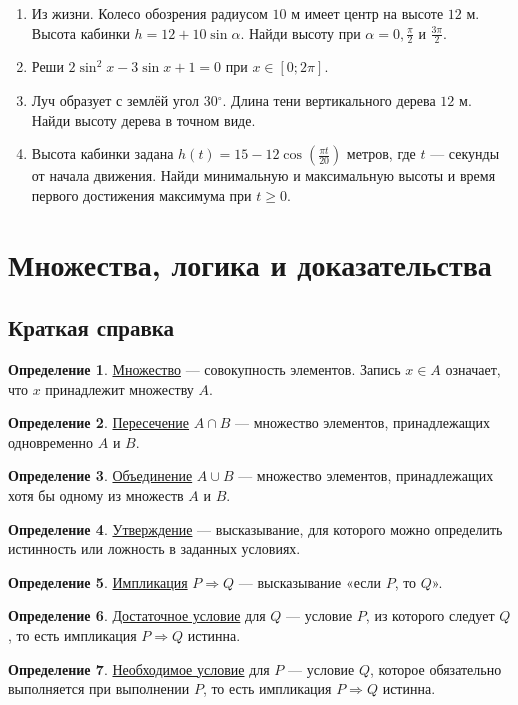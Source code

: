 \documentclass[12pt,a4paper]{article}
\theoremstyle{definition}
\newtheorem{definition}{Определение}[section]
\theoremstyle{plain}
\theoremstyle{remark}
\newcommand{\term}[1]{\uline{#1}}
\newcommand{\starmark}{\ensuremath{{}^{\ast}}}
\begin{document}
\begin{enumerate}[label=\thesection.\arabic*.,leftmargin=2.8em,itemsep=12pt]
\item Из жизни. Колесо обозрения радиусом \(10\) м имеет центр на высоте \(12\) м. Высота кабинки \(h = 12 + 10 \sin  \alpha \). Найди высоту при \(\alpha  = 0,\allowbreak \frac{\pi }{2}\) и \(\frac{3 \pi }{2}\).
\item[\textbf{13.16.}\starmark] Реши \(2 \sin ^{2} x - 3 \sin  x + 1 = 0\) при \(x \in  [0;\allowbreak 2 \pi ]\).
\item[\textbf{13.17.}\starmark] Луч образует с землёй угол \(30 {}^{\circ}\). Длина тени вертикального дерева \(12\) м. Найди высоту дерева в точном виде.
\item[\textbf{13.18.}\starmark] Высота кабинки задана \(h (t) = 15 - 12 \cos  (\frac{\pi  t}{20})\) метров, где \(t\) — секунды от начала движения. Найди минимальную и максимальную высоты и время первого достижения максимума при \(t \ge  0\).
\end{enumerate}
\clearpage
\section{Множества, логика и доказательства}
\subsection*{Краткая справка}
\begin{definition}\term{Множество} — совокупность элементов. Запись \(x \in  A\) означает, что \(x\) принадлежит множеству \(A\).\end{definition}
\begin{definition}\term{Пересечение} \(A\cap B\) — множество элементов, принадлежащих одновременно \(A\) и \(B\).\end{definition}
\begin{definition}\term{Объединение} \(A\cup B\) — множество элементов, принадлежащих хотя бы одному из множеств \(A\) и \(B\).\end{definition}
\begin{definition}\term{Утверждение} — высказывание, для которого можно определить истинность или ложность в заданных условиях.\end{definition}
\begin{definition}\term{Импликация} \(P\Rightarrow Q\) — высказывание «если \(P\), то \(Q\)».\end{definition}
\begin{definition}\term{Достаточное условие} для \(Q\) — условие \(P\), из которого следует \(Q\), то есть импликация \(P\Rightarrow Q\) истинна.\end{definition}
\begin{definition}\term{Необходимое условие} для \(P\) — условие \(Q\), которое обязательно выполняется при выполнении \(P\), то есть импликация \(P\Rightarrow Q\) истинна.\end{definition}
\end{document}
